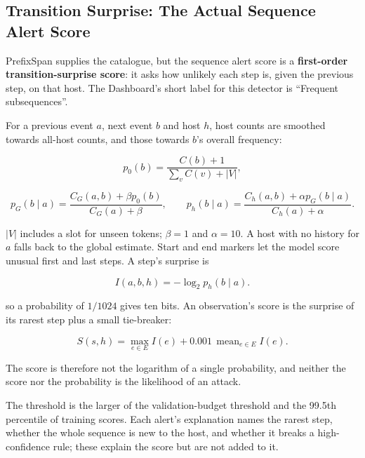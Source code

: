 \documentclass[11pt,a4paper]{article}
\begin{document}
\subsection{Transition Surprise: The Actual Sequence Alert Score}

PrefixSpan supplies the catalogue, but the sequence alert score is a \textbf{first-order transition-surprise score}: it asks how unlikely each step is, given the previous step, on that host. The Dashboard's short label for this detector is ``Frequent subsequences''.

For a previous event \(a\), next event \(b\) and host \(h\), host counts are smoothed towards all-host counts, and those towards \(b\)'s overall frequency:

\begin{equation}
\label{eq:11}
p_0(b)=\frac{C(b)+1}{\sum_v C(v)+|V|},
\end{equation}

\begin{equation}
\label{eq:12}
p_G(b\mid a)=\frac{C_G(a,b)+\beta p_0(b)}{C_G(a)+\beta},\qquad
p_h(b\mid a)=\frac{C_h(a,b)+\alpha p_G(b\mid a)}{C_h(a)+\alpha}.
\end{equation}

\(|V|\) includes a slot for unseen tokens; \(\beta=1\) and \(\alpha=10\). A host with no history for \(a\) falls back to the global estimate. Start and end markers let the model score unusual first and last steps. A step's surprise is

\begin{equation}
\label{eq:13}
I(a,b,h)=-\log_2 p_h(b\mid a).
\end{equation}

so a probability of \(1/1024\) gives ten bits. An observation's score is the surprise of its rarest step plus a small tie-breaker:

\begin{equation}
\label{eq:14}
S(s,h)=\max_{e\in E}I(e)+0.001\,\operatorname{mean}_{e\in E}I(e).
\end{equation}

The score is therefore not the logarithm of a single probability, and neither the score nor the probability is the likelihood of an attack.

The threshold is the larger of the validation-budget threshold and the 99.5th percentile of training scores. Each alert's explanation names the rarest step, whether the whole sequence is new to the host, and whether it breaks a high-confidence rule; these explain the score but are not added to it.
\end{document}
